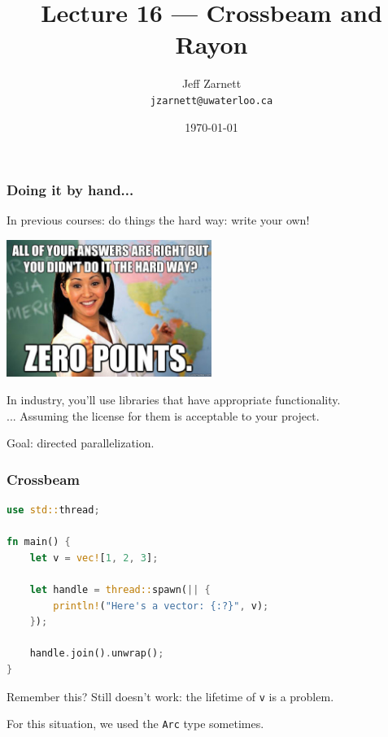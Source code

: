 

\title{Lecture 16 --- Crossbeam and Rayon}

\author{Jeff Zarnett\\ \small \texttt{jzarnett@uwaterloo.ca}}
\date{\today}




\begin{frame}
  \titlepage
 \end{frame}
 
 

\begin{frame}
\frametitle{Doing it by hand...}

In previous courses: do things the hard way: write your own!

\begin{center}
	\includegraphics[width=0.5\textwidth]{images/zeropoints.jpg}
\end{center}

In industry, you'll use libraries that have appropriate functionality.\\
\quad ... Assuming the license for them is acceptable to your project.

Goal: directed parallelization. 

\end{frame}


\begin{frame}[fragile]
\frametitle{Crossbeam}

\begin{lstlisting}[language=Rust]
use std::thread;

fn main() {
    let v = vec![1, 2, 3];

    let handle = thread::spawn(|| {
        println!("Here's a vector: {:?}", v);
    });

    handle.join().unwrap();
}
\end{lstlisting}

Remember this? Still doesn't work: the lifetime of \texttt{v} is a problem.

For this situation, we used the \texttt{Arc} type sometimes.
\end{frame}

